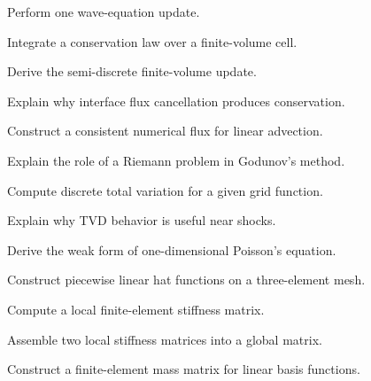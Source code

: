 \begin{exercise}[3]
Perform one wave-equation update.
\end{exercise}

\begin{exercise}[2]
Integrate a conservation law over a finite-volume cell.
\end{exercise}

\begin{exercise}[3]
Derive the semi-discrete finite-volume update.
\end{exercise}

\begin{exercise}[3]
Explain why interface flux cancellation produces conservation.
\end{exercise}

\begin{exercise}[3]
Construct a consistent numerical flux for linear advection.
\end{exercise}

\begin{exercise}[3]
Explain the role of a Riemann problem in Godunov's method.
\end{exercise}

\begin{exercise}[3]
Compute discrete total variation for a given grid function.
\end{exercise}

\begin{exercise}[3]
Explain why TVD behavior is useful near shocks.
\end{exercise}

\begin{exercise}[2]
Derive the weak form of one-dimensional Poisson's equation.
\end{exercise}

\begin{exercise}[3]
Construct piecewise linear hat functions on a three-element mesh.
\end{exercise}

\begin{exercise}[3]
Compute a local finite-element stiffness matrix.
\end{exercise}

\begin{exercise}[3]
Assemble two local stiffness matrices into a global matrix.
\end{exercise}

\begin{exercise}[3]
Construct a finite-element mass matrix for linear basis functions.
\end{exercise}


